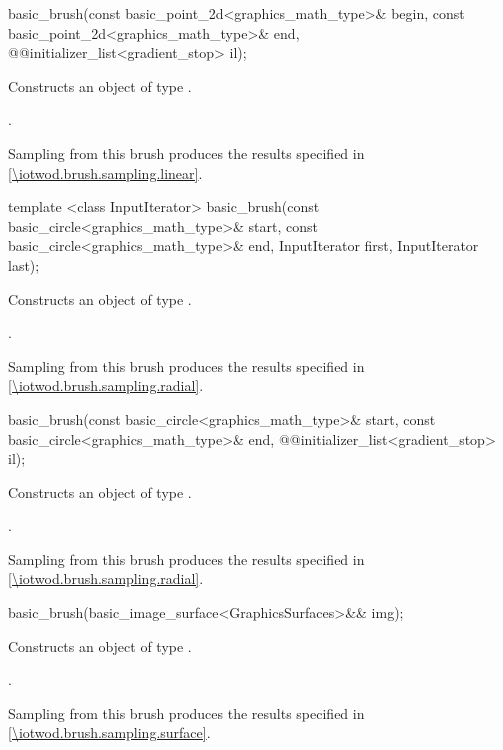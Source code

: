 %
\begin{itemdecl}
basic_brush(const basic_point_2d<graphics_math_type>& begin,
  const basic_point_2d<graphics_math_type>& end,
  @\stdqualifier{}@initializer_list<gradient_stop> il);
\end{itemdecl}
\begin{itemdescr}
\pnum
\effects
Constructs an object of type .

\pnum
\postconditions
{}.

\pnum
\remarks
Sampling from this brush produces the results specified in \ref{\iotwod.brush.sampling.linear}.
\end{itemdescr}

%
\begin{itemdecl}
template <class InputIterator>
basic_brush(const basic_circle<graphics_math_type>& start,
  const basic_circle<graphics_math_type>& end,
  InputIterator first, InputIterator last);
\end{itemdecl}
\begin{itemdescr}
\pnum
\effects
Constructs an object of type .

\pnum
\postconditions
{}.

\pnum
\remarks
Sampling from this brush produces the results specified in \ref{\iotwod.brush.sampling.radial}.
\end{itemdescr}

%
\begin{itemdecl}
basic_brush(const basic_circle<graphics_math_type>& start,
  const basic_circle<graphics_math_type>& end,
  @\stdqualifier{}@initializer_list<gradient_stop> il);
\end{itemdecl}
\begin{itemdescr}
\pnum
\effects
Constructs an object of type .

\pnum
\postconditions
{}.

\pnum
\remarks
Sampling from this brush produces the results specified in \ref{\iotwod.brush.sampling.radial}.
\end{itemdescr}

%
\begin{itemdecl}
basic_brush(basic_image_surface<GraphicsSurfaces>&& img);
\end{itemdecl}
\begin{itemdescr}
\pnum
\effects
Constructs an object of type .

\pnum
\postconditions
{}.

\pnum
Sampling from this brush produces the results specified in \ref{\iotwod.brush.sampling.surface}.
\end{itemdescr}

